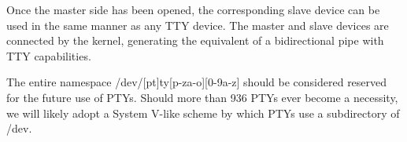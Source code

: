 Once the master side has been opened, the corresponding slave device
can be used in the same manner as any TTY device.  The master and
slave devices are connected by the kernel, generating the equivalent
of a bidirectional pipe with TTY capabilities.

The entire namespace {\file /dev/[pt]ty[p-za-o][0-9a-z]\/} should be
considered reserved for the future use of PTYs.  Should more than 936
PTYs ever become a necessity, we will likely adopt a System V-like
scheme by which PTYs use a subdirectory of {\file /dev}.


